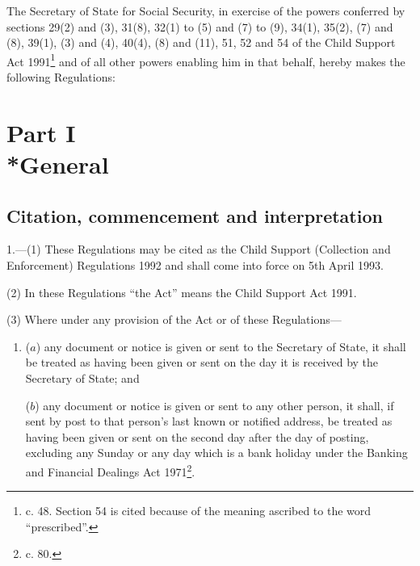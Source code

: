 \documentclass[12pt,a4paper]{article}
\title{\regstitle}
\author{S.I. 1992 No. 1989}
\date{Made 17th August 1992\\Laid before Parliament 26th August 1992\\Coming into force 5th April 1993}
\begin{document}
\maketitle

\noindent
The Secretary of State for Social Security, in exercise of the powers conferred by sections 29(2) and (3), 31(8), 32(1) to (5) and (7) to (9), 34(1), 35(2), (7) and (8), 39(1), (3) and (4), 40(4), (8) and (11), 51, 52 and 54 of the Child Support Act 1991\footnote{ c. 48. Section 54 is cited because of the meaning ascribed to the word “prescribed”.} and of all other powers enabling him in that behalf, hereby makes the following Regulations:

{\sloppy

\tableofcontents

}

\setcounter{secnumdepth}{-2}

\section[Part I --- General]{Part I\\*General}

\subsection[1. Citation, commencement and interpretation]{Citation, commencement and interpretation}

\renewcommand\parthead{--- Part I}

1.—(1) These Regulations may be cited as the Child Support (Collection and Enforcement) Regulations 1992 and shall come into force on 5th April 1993.

(2) In these Regulations “the Act” means the Child Support Act 1991.

(3) Where under any provision of the Act or of these Regulations—
\begin{enumerate}\item[]
($a$) any document or notice is given or sent to the Secretary of State, it shall be treated as having been given or sent on the day it is received by the Secretary of State; and

($b$) any document or notice is given or sent to any other person, it shall, if sent by post to that person’s last known or notified address, be treated as having been given or sent on the second day after the day of posting, excluding any Sunday or any day which is a bank holiday under the Banking and Financial Dealings Act 1971\footnote{ c. 80.}.
\end{enumerate}
\end{document}
